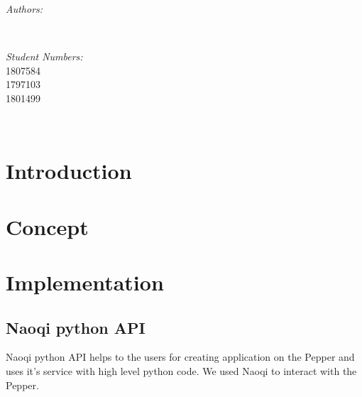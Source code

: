 \documentclass[12pt]{article}
\makeatletter
\newcommand{\studentnumber}{1807584 \\ 1797103 \\ 1801499}
\let\theauthor\@author
\makeatother
\begin{document}
\begin{titlepage}
        \begin{minipage}{0.4\textwidth}
               \begin{flushleft} \large
                       \emph{Authors:}\\
                       \theauthor
                       \end{flushleft}
                       \end{minipage}~
                       \begin{minipage}{0.4\textwidth}
                       \begin{flushright} \large
                       \emph{Student Numbers:} \\
                       \studentnumber
               \end{flushright}
        \end{minipage}\\[2 cm]
 
 
        \vfill
 
\end{titlepage}
 
 
\tableofcontents
\pagebreak
 
 
\pagebreak
 
\section{Introduction}
 
\newpage
\section{Concept}
 
\newpage
\section{Implementation}
\subsection{Naoqi python API}
Naoqi python API helps to the users for creating application on the Pepper and uses it's service with high level python code. We used Naoqi to interact with the Pepper.
\end{document}
